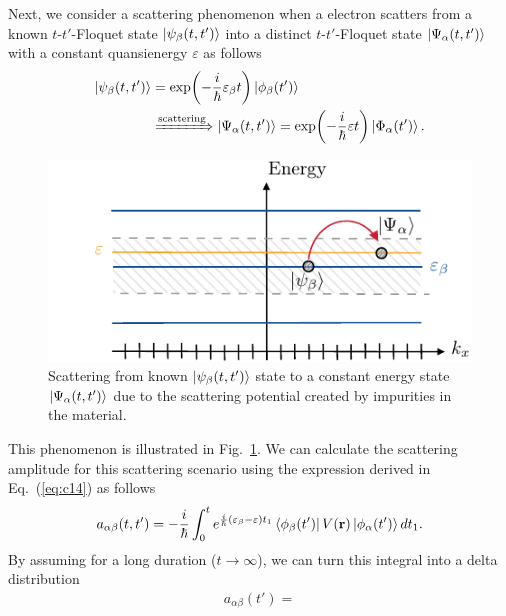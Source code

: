 \documentclass[
 reprint,
 amsmath,amssymb,
 aps,
 prb,
]{revtex4-2}
\begin{document}
\begin{appendix}
Next, we consider a scattering phenomenon when a electron scatters from a known $t$-$t'$-Floquet state $\ket{\psi_{\beta}(t,t')} $ into a distinct $t$-$t'$-Floquet state $\ket{\Psi_{\alpha}(t,t')}$ with a constant quansienergy $\varepsilon$ as follows
\begin{equation} \label{eq:c15}
  \begin{aligned}
  \ket{\psi_{\beta}(t,t')} &= \exp(-\frac{i}{\hbar}\varepsilon_{\beta} t)
  \ket{\phi_{\beta}(t')} \\
  &
  \xRightarrow{\text{scattering}}
  \ket{\Psi_{\alpha}(t,t')} = \exp(-\frac{i}{\hbar}\varepsilon t)
  \ket{\Phi_{\alpha}(t')}.
  \end{aligned}
\end{equation}
\begin{figure}[b]
  \includegraphics[scale=1.0]{figures/fig_6.pdf}
  \caption{Scattering from known $\ket{\psi_{\beta}(t,t')}$ state to a constant energy state $\ket{\Psi_{\alpha}(t,t')}$ due to the scattering potential created by impurities in the material.}
  \label{fig:2}
\end{figure}
This phenomenon is illustrated in Fig.~\ref{fig:2}.
We can calculate the scattering amplitude for this scattering scenario using the expression derived in Eq.~(\ref{eq:c14}) as follows
\begin{equation} \label{eq:c16}
  \begin{aligned}
    a_{\alpha\beta}(t,t') =
    -\frac{i}{\hbar}
    \int_{0}^t
    e^{\frac{i}{\hbar}\left(\varepsilon_{\beta} - \varepsilon \right)t_1}
    \bra{\phi_{\beta}(t')}
    V(\vb{r}) \ket{\phi_{\alpha}(t')}  dt_1.
  \end{aligned}
\end{equation}
By assuming for a long duration ($t \rightarrow \infty$), we can turn this integral into a delta distribution
\begin{equation} \label{eq:c17}
  \begin{aligned}
    a_{\alpha\beta}(t') =

\end{aligned}
\end{equation}
\end{appendix}
\end{document}
